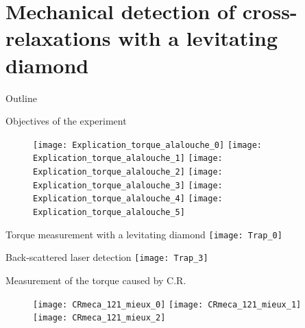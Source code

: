 \documentclass{beamer}
\begin{document}
\section{Mechanical detection of cross-relaxations with a levitating diamond}
\begin{frame}{Outline}
\tableofcontents[currentsection]
\end{frame}
\begin{frame}{Objectives of the experiment}
\begin{figure}
    \begin{overprint}
    \texttt{[image: Explication\_torque\_alalouche\_0]}
    \texttt{[image: Explication\_torque\_alalouche\_1]}
    \texttt{[image: Explication\_torque\_alalouche\_2]}
    \texttt{[image: Explication\_torque\_alalouche\_3]}
    \texttt{[image: Explication\_torque\_alalouche\_4]}
    \texttt{[image: Explication\_torque\_alalouche\_5]}
    \end{overprint}
\end{figure}
\end{frame}
\begin{frame}{Torque measurement with a levitating diamond}
\centering
\texttt{[image: Trap\_0]}%
\end{frame}
\begin{frame}{Back-scattered laser detection}
\centering
\texttt{[image: Trap\_3]}%
\end{frame}
\begin{frame}{Measurement of the torque caused by C.R.}
\begin{figure}
    \begin{overprint}
    \texttt{[image: CRmeca\_121\_mieux\_0]}
    \texttt{[image: CRmeca\_121\_mieux\_1]}
    \texttt{[image: CRmeca\_121\_mieux\_2]}
    \end{overprint}
\end{figure}
\end{frame}
\end{document}
